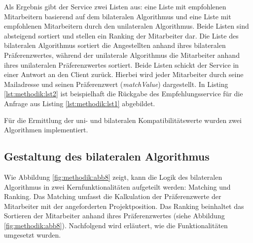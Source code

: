 Als Ergebnis gibt der Service zwei Listen aus: eine Liste mit empfohlenen Mitarbeitern basierend auf dem bilateralen Algorithmus und eine Liste mit empfohlenen Mitarbeitern durch den unilateralen Algorithmus.
Beide Listen sind absteigend sortiert und stellen ein Ranking der Mitarbeiter dar.
Die Liste des bilateralen Algorithmus sortiert die Angestellten anhand ihres bilateralen Präferenzwertes, während der unilaterale Algorithmus die Mitarbeiter anhand ihres unilateralen Präferenzwertes sortiert.
Beide Listen schickt der Service in einer Antwort an den Client zurück.
Hierbei wird jeder Mitarbeiter durch seine Mailadresse und seinen Präferenzwert (\textit{matchValue}) dargestellt.
In Listing \ref{lst:methodik:lst2} ist beispielhaft die Rückgabe des Empfehlungsservice für die Anfrage aus Listing \ref{lst:methodik:lst1} abgebildet.



Für die Ermittlung der uni- und bilateralen Kompatibilitätswerte wurden zwei Algorithmen implementiert.


\subsection{Gestaltung des bilateralen Algorithmus}
Wie Abbildung \ref{fig:methodik:abb8} zeigt, kann die Logik des bilateralen Algorithmus in zwei Kernfunktionalitäten aufgeteilt werden: Matching und Ranking.
Das Matching umfasst die Kalkulation der Präferenzwerte der Mitarbeiter mit der angeforderten Projektposition.
Das Ranking beinhaltet das Sortieren der Mitarbeiter anhand ihres Präferenzwertes (siehe Abbildung \ref{fig:methodik:abb8}).
Nachfolgend wird erläutert, wie die Funktionalitäten umgesetzt wurden.

